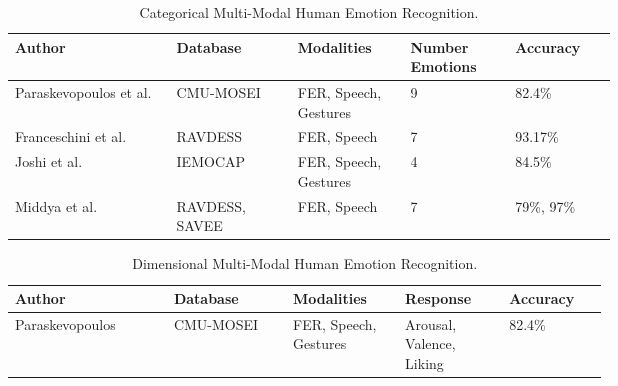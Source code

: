     \begin{table}[ht]
        \centering
        \begin{tabular}{|p{0.2\linewidth}|p{0.15\linewidth}|p{0.12\linewidth}|p{0.122\linewidth}|p{0.11\linewidth}|}
        \hline
        Author & Database & Modalities & Number Emotions & Accuracy\\\hline
        
        Paraskevopoulos et al. \cite{paraskevopoulos-2022}
        & CMU-MOSEI
        & FER, Speech, Gestures
        & 9
        & 82.4\%\\\hline
        
        Franceschini et al. \cite{franceschini-2022}
        & RAVDESS
        & FER, Speech
        & 7
        & 93.17\%\\\hline
        
        Joshi et al. \cite{joshi-2022}
        & IEMOCAP
        & FER, Speech, Gestures
        & 4
        & 84.5\%\\\hline
        
        Middya et al. \cite{middya-2022}
        & RAVDESS, SAVEE
        & FER, Speech
        & 7
        & 79\%, 97\%\\\hline
        
        \end{tabular}
        \caption{\label{tab:categories}Categorical Multi-Modal Human Emotion Recognition.}
    \end{table}


    \begin{table}[ht]
        \centering
        \begin{tabular}{|p{0.2\linewidth}|p{0.15\linewidth}|p{0.12\linewidth}|p{0.122\linewidth}|p{0.1\linewidth}|}
        \hline
        Author & Database & Modalities & Response & Accuracy\\\hline
        
        Paraskevopoulos \cite{paraskevopoulos-2022}
        & CMU-MOSEI
        & FER, Speech, Gestures
        & Arousal, Valence, Liking
        & 82.4\%\\\hline
        
        \end{tabular}
        \caption{\label{tab:dimension}Dimensional Multi-Modal Human Emotion Recognition.}
    \end{table}